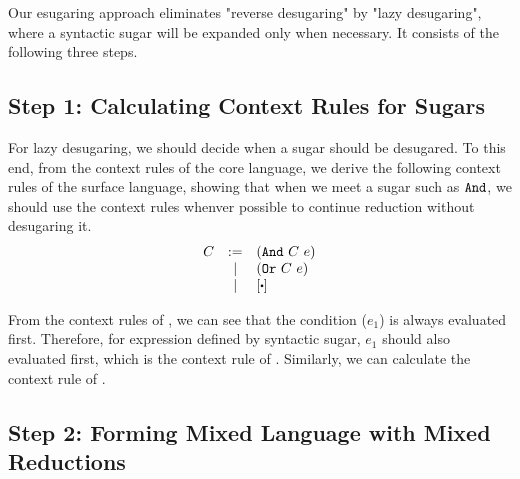 Our esugaring approach eliminates "reverse desugaring" by "lazy desugaring", where a syntactic sugar will be expanded only when necessary. It consists of the following three steps.

\subsection*{Step 1: Calculating Context Rules for Sugars}

For lazy desugaring, we should decide when a sugar should be desugared. To this end, from the context rules of the core language, we derive the following context rules of the surface language, showing that when we meet a sugar such as $\mbox{\tt And}$, we should use the context rules whenver possible to continue reduction without desugaring it.
\[
\begin{array}{lcl}
C &:=& (\m{And}~C~e)\\
&|& (\m{Or}~C~e)\\
&|&[\bigcdot]\\
\end{array}
\]

From the context rules of , we can see that the condition ($e_1$) is always evaluated first. Therefore, for expression  defined by syntactic sugar, $e_1$ should also evaluated first, which is the context rule of . Similarly, we can calculate the context rule of .

\subsection*{Step 2: Forming Mixed Language with Mixed Reductions}

